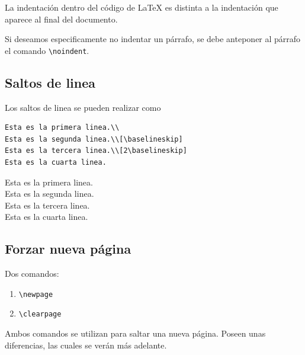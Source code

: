 \documentclass[../notes.tex]{subfiles}
\begin{document}
        La indentación dentro del código de \LaTeX{} es distinta a la indentación que aparece al final del documento.
        
        Si deseamos especificamente no indentar un párrafo, se debe anteponer al párrafo el comando \texttt{\textbackslash noindent}.

    \subsection{Saltos de linea}

        Los saltos de linea se pueden realizar como
            \begin{verbatim}
Esta es la primera linea.\\
Esta es la segunda linea.\\[\baselineskip]
Esta es la tercera linea.\\[2\baselineskip]
Esta es la cuarta linea.
            \end{verbatim}
Esta es la primera linea.\\
Esta es la segunda linea.\\[\baselineskip]
Esta es la tercera linea.\\[2\baselineskip]
Esta es la cuarta linea.

    \subsection{Forzar nueva página}
    
        Dos comandos:
            \begin{enumerate}
                \item \texttt{\textbackslash newpage}
                \item \texttt{\textbackslash clearpage}
            \end{enumerate}
        Ambos comandos se utilizan para saltar una nueva página. Poseen unas diferencias, las cuales se verán más adelante.
    
\end{document}
